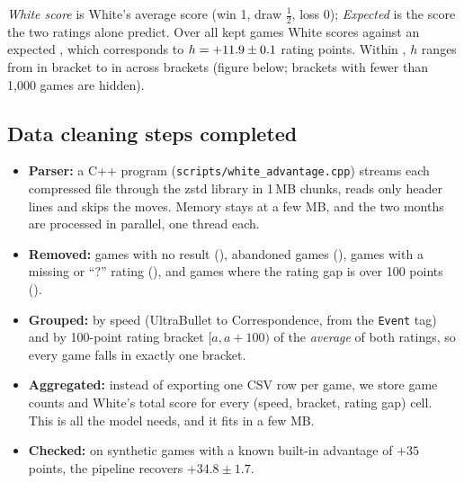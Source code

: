 \documentclass[11pt,a4paper]{article}
\begin{document}
\emph{White score} is White's average score (win 1, draw $\tfrac12$, loss 0); \emph{Expected} is the
score the two ratings alone predict. Over all kept games White scores \ScoreAll{} against an expected
\ExpectedAll, which corresponds to $h = +11.9 \pm 0.1$ rating points. Within \MainSpeed{}, $h$
ranges from \HMin{} in bracket \HMinBand{} to \HMax{} in \HMaxBand{} across \MainBands{} brackets
(figure below; brackets with fewer than 1{,}000 games are hidden).

\begin{center}
\Figure
\end{center}

\subsection*{Data cleaning steps completed}
\begin{itemize}
\item \textbf{Parser:} a C++ program (\texttt{scripts/white\_advantage.cpp}) streams each
  compressed file through the zstd library in 1\,MB chunks, reads only header lines and skips the
  moves. Memory stays at a few MB, and the two months are processed in parallel, one thread each.
 
\item \textbf{Removed:} games with no result (\SkipNoResult), abandoned games (\SkipAbandoned),
  games with a missing or ``?'' rating (\SkipNoRating), and games where the rating gap is over
  100 points (\SkipGap).
\item \textbf{Grouped:} by speed (UltraBullet to Correspondence, from the \texttt{Event} tag) and by
  100-point rating bracket $[a, a{+}100)$ of the \emph{average} of both ratings, so every game falls
  in exactly one bracket.
\item \textbf{Aggregated:} instead of exporting one CSV row per game, we store game counts and
  White's total score for every (speed, bracket, rating gap) cell. This is all the model needs, and
  it fits in a few MB.
\item \textbf{Checked:} on synthetic games with a known built-in advantage of $+35$ points, the
  pipeline recovers $+34.8 \pm 1.7$.
\end{itemize}
\end{document}
